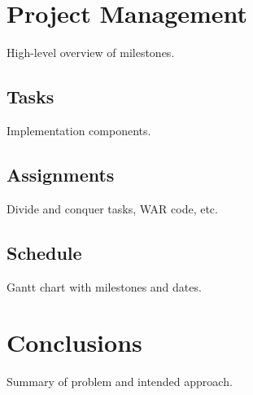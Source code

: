 \documentclass[a4paper,11pt]{article}
\begin{document}
%
\section{Project Management}\label{sec:management}
High-level overview of milestones.

\subsection{Tasks}\label{sec:tasks}
Implementation components.

\subsection{Assignments}\label{sec:assignments}
Divide and conquer tasks, WAR code, etc.

\subsection{Schedule}\label{sec:schedule}
Gantt chart with milestones and dates.

%
\section{Conclusions}\label{sec:conclusions}
Summary of problem and intended approach.

%
%

\end{document}
